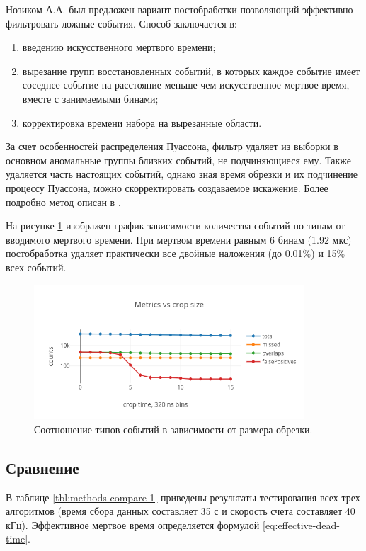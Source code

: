 \documentclass[a4paper,14pt]{extreport}
\begin{document}
Нозиком А.А. был предложен вариант постобработки позволяющий эффективно фильтровать ложные события. Способ заключается в:

\begin{enumerate}
    \item введению искусственного мертвого времени;
    \item вырезание групп восстановленных событий, в которых каждое событие имеет соседнее событие на расстояние меньше чем искусственное мертвое время, вместе с занимаемыми бинами;
    \item корректировка времени набора на вырезанные области.
\end{enumerate}
За счет особенностей распределения Пуассона, фильтр удаляет из выборки в основном аномальные группы близких событий, не подчиняющиеся ему. Также удаляется часть настоящих событий, однако зная время обрезки и их подчинение процессу Пуассона, можно скорректировать создаваемое искажение. Более подробно метод описан в \cite{1810.07024}.

На рисунке \ref{fig:method-3-crop} изображен график зависимости количества событий по типам от вводимого мертвого времени. При мертвом времени равным 6 бинам (1.92 мкс) постобработка удаляет практически все двойные наложения (до 0.01\%) и 15\% всех событий.

\begin{figure}
  \centering
  \includegraphics[width = 0.9\textwidth]{img/signals/method_3/crop.png}
  \caption{Соотношение типов событий в зависимости от размера обрезки.}
  \label{fig:method-3-crop}
\end{figure}

\subsection{Сравнение}

В таблице \ref{tbl:methods-compare-1} приведены результаты тестирования всех трех алгоритмов (время сбора данных составляет 35 с и скорость счета составляет 40 кГц). Эффективное мертвое время определяется формулой \ref{eq:effective-dead-time}.
\end{document}
